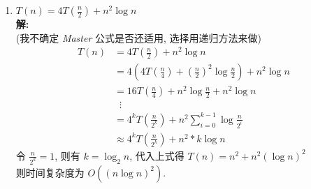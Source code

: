 \documentclass[a4paper]{ctexart}
\begin{document}
\begin{sloppypar}
\begin{enumerate}[(1)]
        \item $T(n) = 4T(\frac{n}{2}) + n^2 \log n$ \\
              \textbf{解:} \\
              (我不确定 \emph{Master} 公式是否还适用, 选择用递归方法来做) \\
              \begin{equation}
                  \begin{aligned}
                      \nonumber
                      T(n) & = 4T(\frac{n}{2}) + n^2 \log n                                         \\
                           & = 4(4T(\frac{n}{4}) + (\frac{n}{2})^2 \log {\frac{n}{2}}) + n^2 \log n \\
                           & = 16T(\frac{n}{4}) + n^2 \log {\frac{n}{2}} + n^2 \log n               \\
                           & \;\;\vdots                                                             \\
                           & = 4^kT(\frac{n}{2^k}) + n^2 \sum_{i=0}^{k-1} \log {\frac{n}{2^i}}      \\
                           & \approx 4^kT(\frac{n}{2^k}) + n^2 * k \log n
                  \end{aligned}
              \end{equation}
              令 $\frac{n}{2^k} = 1$, 则有 $k = \log_2 n$, 代入上式得 $T(n) = n^2 + n^2 (\log n)^2$ \\
              则时间复杂度为 $O((n \log n)^2)$.
    \end{enumerate}


\end{sloppypar}
\end{document}
